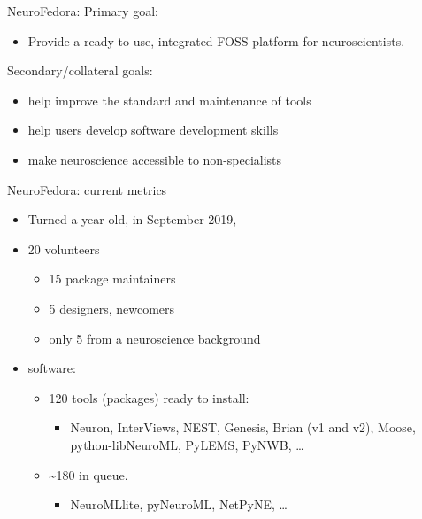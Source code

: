 \begin{frame}[c]{NeuroFedora:}
	\textcolor{FedoraBlue}{Primary goal:}
	\begin{itemize}
		\item Provide a \alert{ready to use, integrated FOSS platform} for neuroscientists\footnotemark[7].
	\end{itemize}
	\textcolor{FirstGreen}{Secondary/collateral goals:}
	\begin{itemize}
		\item help \alert{improve the standard and maintenance} of tools
		\item help users \alert{develop software development skills}
		\item \alert{make neuroscience accessible} to non-specialists
	\end{itemize}
\end{frame}

\begin{frame}[c]{NeuroFedora: current metrics}
	\begin{itemize}
		\item \alert{Turned a year old, in September 2019\footnotemark[8],}
		\item \textcolor{FirstGreen}{20 volunteers}
		\begin{itemize}
			\item 15 package maintainers
			\item 5 designers, newcomers
			\item only 5 from a neuroscience background
		\end{itemize}
		\item \textcolor{FriendsMagenta}{software:}
		\begin{itemize}
			\item 120 tools (packages) ready to install\footnotemark[9]:
			\begin{itemize}
				\item Neuron, InterViews, NEST, Genesis, Brian (v1 and v2), Moose, python-libNeuroML, PyLEMS, PyNWB, \ldots
			\end{itemize}
			\item \textasciitilde{}180 in queue\footnotemark[10].
			\begin{itemize}
				\item NeuroMLlite, pyNeuroML, NetPyNE, \ldots
			\end{itemize}
		\end{itemize}
	\end{itemize}
\end{frame}

